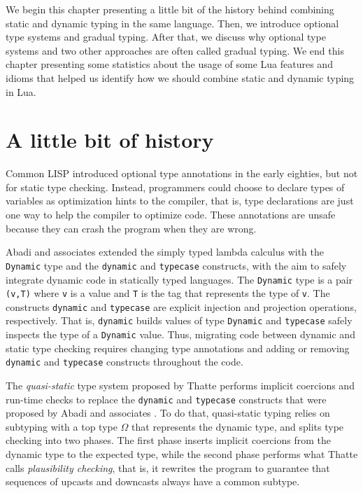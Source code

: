 We begin this chapter presenting a little bit of the history behind
combining static and dynamic typing in the same language.
Then, we introduce optional type systems and gradual typing.
After that, we discuss why optional type systems and two
other approaches are often called gradual typing.
We end this chapter presenting some statistics about the usage of
some Lua features and idioms that helped us identify how we should
combine static and dynamic typing in Lua.

\section{A little bit of history}
\label{sec:history}

Common LISP \cite{steele1982ocl} introduced optional type annotations
in the early eighties, but not for static type checking.
Instead, programmers could choose to declare types of variables as
optimization hints to the compiler, that is, type declarations are
just one way to help the compiler to optimize code.
These annotations are unsafe because they can crash the program
when they are wrong.

Abadi and associates \cite{abadi1989dts} extended the simply typed
lambda calculus with the \texttt{Dynamic} type and the \texttt{dynamic}
and \texttt{typecase} constructs, with the aim to safely integrate dynamic
code in statically typed languages.
The \texttt{Dynamic} type is a pair \texttt{(v,T)} where \texttt{v} is a
value and \texttt{T} is the tag that represents the type of \texttt{v}.
The constructs \texttt{dynamic} and \texttt{typecase} are explicit
injection and projection operations, respectively.
That is, \texttt{dynamic} builds values of type \texttt{Dynamic} and
\texttt{typecase} safely inspects the type of a \texttt{Dynamic} value.
Thus, migrating code between dynamic and static type checking requires
changing type annotations and adding or removing \texttt{dynamic} and
\texttt{typecase} constructs throughout the code.

The \emph{quasi-static} type system proposed by Thatte \cite{thatte1990qst}
performs implicit coercions and run-time checks to replace the
\texttt{dynamic} and \texttt{typecase} constructs that were proposed by
Abadi and associates \cite{abadi1989dts}.
To do that, quasi-static typing relies on subtyping with a top type
$\Omega$ that represents the dynamic type, and splits type checking
into two phases.
The first phase inserts implicit coercions from the dynamic type to
the expected type, while the second phase performs what Thatte calls
\emph{plausibility checking}, that is, it rewrites the program to
guarantee that sequences of upcasts and downcasts always have a
common subtype.

